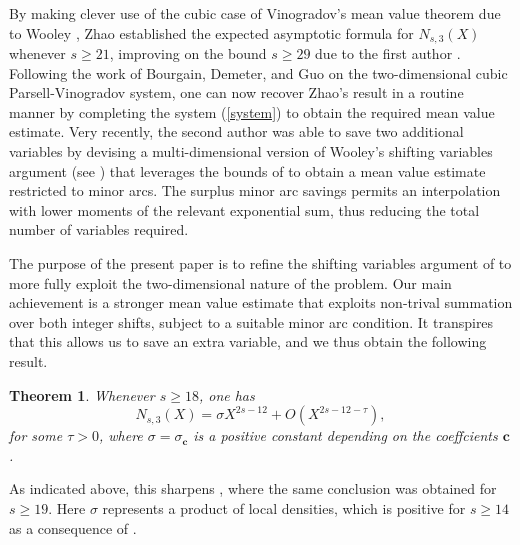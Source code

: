 \documentclass{amsart}%
\numberwithin{equation}{section}
\newtheorem{theorem}{Theorem}[section]
\theoremstyle{remark}
\newcommand{\1}{\mathbbm{1}}
\begin{document}
By making clever use of the cubic case of Vinogradov's mean value theorem due to Wooley \cite{MR3479572}, Zhao \cite{MR3552298} established the expected asymptotic formula for $N_{s,3}(X)$ whenever $s \ge 21$, improving on the bound $s \ge 29$ due to the first author \cite{MR2965969}. 
Following the work of Bourgain, Demeter, and Guo \cite{MR3709122} on the two-dimensional cubic Parsell-Vinogradov system, one can now recover Zhao's result in a routine manner by completing the system (\ref{system}) 
to obtain the required mean value estimate. Very recently, the second author \cite{ky2026} was able to save two additional variables by devising a multi-dimensional version of Wooley's shifting variables argument (see \cite{MR2913181}) that leverages the bounds of \cite{MR3709122} to obtain a mean value estimate restricted to minor arcs. The surplus minor arc savings permits an interpolation with lower moments of the relevant exponential sum, thus reducing the total number of variables required. 


The purpose of the present paper is to refine the shifting variables argument of \cite{ky2026} to more fully exploit the two-dimensional nature of the problem. 
Our main achievement is a stronger mean value estimate that exploits non-trival summation over both integer shifts, subject to a suitable minor arc condition. It transpires that this allows us to save an extra variable, and we thus obtain the following result.

\begin{theorem}\label{cubic theorem}
    Whenever $s\geq 18$, one has
    \begin{equation*}\label{cubic AF}
        N_{s,3}(X)=\sigma X^{2s-12}+O(X^{2s-12-\tau}),
    \end{equation*}
    for some $\tau>0$, where $\sigma =\sigma_{\boldsymbol{c}}$ is a positive constant depending on the coeffcients $\boldsymbol{c}$.
\end{theorem}

As indicated above, this sharpens \cite[Theorem 1.1]{ky2026}, where the same conclusion was obtained for $s \ge 19$. Here $\sigma$ represents a product of local densities, which is positive for $s \ge 14$ as a consequence of \cite[Lemma 5.1]{MR1778504}.
\end{document}
